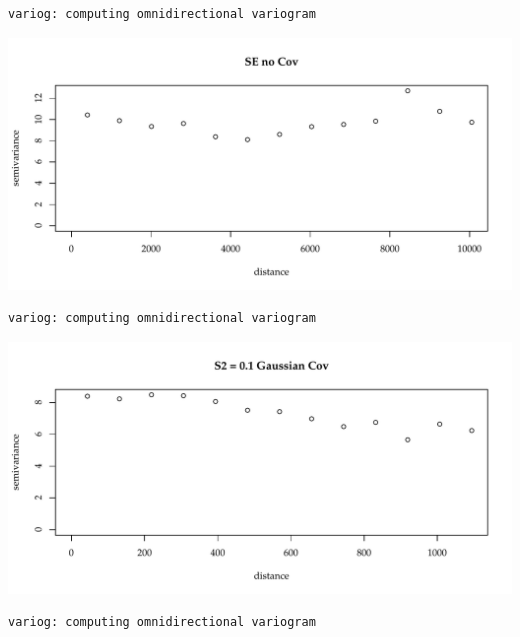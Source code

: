 \documentclass{article}\usepackage[]{graphicx}\usepackage[]{color}
\makeatletter
\def\maxwidth{ %
  \ifdim\Gin@nat@width>\linewidth
    \linewidth
  \else
    \Gin@nat@width
  \fi
}
\newenvironment{kframe}{%
 \def\at@end@of@kframe{}%
 \ifinner\ifhmode%
  \def\at@end@of@kframe{\end{minipage}}%
  \begin{minipage}{\columnwidth}%
 \fi\fi%
 \def\FrameCommand##1{\hskip\@totalleftmargin \hskip-\fboxsep
 \colorbox{shadecolor}{##1}\hskip-\fboxsep
     \hskip-\linewidth \hskip-\@totalleftmargin \hskip\columnwidth}%
 \MakeFramed {\advance\hsize-\width
   \@totalleftmargin\z@ \linewidth\hsize
   \@setminipage}}%
 {\par\unskip\endMakeFramed%
 \at@end@of@kframe}
\newenvironment{knitrout}{}{} %
\makeatother
\begin{document}
\begin{knitrout}\footnotesize
{}\color{fgcolor}\begin{kframe}


{\ttfamily\noindent\bfseries\color{errorcolor}{Error in array(x, c(length(x), 1L), if (!is.null(names(x))) list(names(x), : 'data' must be of a vector type, was 'NULL'}}\begin{verbatim}
variog: computing omnidirectional variogram
\end{verbatim}
\end{kframe}

{\centering \includegraphics[width=\maxwidth]{figure/sims_se-1} 

}


\begin{kframe}\begin{verbatim}
variog: computing omnidirectional variogram
\end{verbatim}
\end{kframe}

{\centering \includegraphics[width=\maxwidth]{figure/sims_se-2} 

}


\begin{kframe}\begin{verbatim}
variog: computing omnidirectional variogram
\end{verbatim}
\end{kframe}


\end{knitrout}
\end{document}
